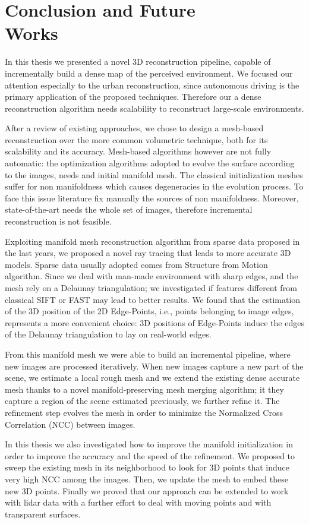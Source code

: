 \chapter[Conclusion and Future Works]{Conclusion and Future \\Works}
\label{ch:future_works}
In this thesis we presented a novel 3D reconstruction pipeline, capable of incrementally build a dense map of the perceived environment.
We focused our attention especially to the urban reconstruction, since autonomous driving is the primary application of the proposed techniques.
Therefore our a dense reconstruction algorithm needs scalability to reconstruct large-scale environments.


After a review of existing approaches, we chose to design a mesh-based reconstruction over the more common volumetric technique, both for its scalability and its accuracy. 
Mesh-based algorithms however are not fully automatic: the optimization algorithms adopted to evolve the surface according to the images, needs and initial manifold mesh. 
The classical initialization meshes suffer for non manifoldness which causes degeneracies in the evolution process. 
To face this issue literature fix manually the sources of non manifoldness. 
Moreover,  state-of-the-art  needs the whole set of images, therefore incremental reconstruction is not feasible.

Exploiting  manifold mesh reconstruction algorithm from sparse data proposed in the last years, we proposed a  novel ray tracing that leads to more accurate 3D models. 
Sparse data usually adopted comes from Structure from Motion algorithm.  
Since we deal with man-made environment with sharp edges, and the mesh rely on a Delaunay triangulation; we investigated if features different from classical SIFT or FAST may lead to better results. 
We found that the estimation of the 3D position of the 2D Edge-Points, i.e., points belonging to image edges, represents a more convenient choice: 3D positions of Edge-Points induce the edges of the Delaunay triangulation to lay on real-world edges.

From this manifold mesh we were able to build an incremental pipeline, where new images are processed iteratively.
When new images  capture a new part of the scene, we estimate a local rough mesh and we extend the existing dense accurate mesh thanks to a novel manifold-preserving mesh merging algorithm; it they capture a region of the scene estimated previously, we further refine it.
The refinement step evolves the mesh in order to minimize the Normalized Cross Correlation (NCC) between images.

In this thesis we also investigated how to improve the manifold initialization in order to improve the accuracy and the speed of the refinement. 
We proposed to sweep the existing mesh in its neighborhood to look for 3D points that induce very high NCC among the images. Then, we  update the mesh to embed these new 3D points.
Finally we proved that our approach can be extended to work with lidar data with a further effort to deal with moving points and with transparent surfaces.



